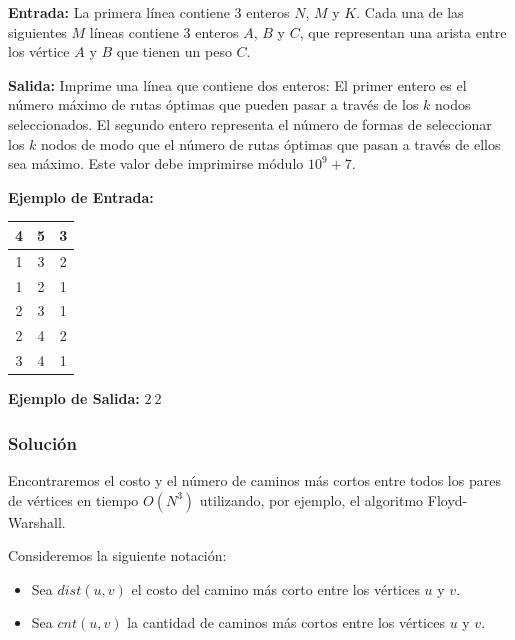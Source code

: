 \documentclass[12pt]{article}
\newcommand{\nl}{\vspace{0.3cm}}
\begin{document}
\nl

\textbf{Entrada:} La primera línea contiene $3$ enteros $N$, $M$ y $K$. Cada una de las siguientes $M$ líneas contiene $3$ enteros $A$, $B$ y $C$, que representan una arista entre los vértice $A$ y $B$ que tienen un peso $C$.

\nl

\textbf{Salida:} Imprime una línea que contiene dos enteros: El primer entero es el número máximo de rutas óptimas que pueden pasar a través de los $k$ nodos seleccionados. El segundo entero representa el número de formas de seleccionar los $k$ nodos de modo que el número de rutas óptimas que pasan a través de ellos sea máximo. Este valor debe imprimirse módulo $10^9 +7$.

\nl

\textbf{Ejemplo de Entrada:}

\nl

\begin{tabular}{|c|c|c|}
	\hline 4 & 5 & 3 \\ 
	\hline 1 & 3 & 2 \\ 
	\hline 1 & 2 & 1 \\ 
	\hline 2 & 3 & 1 \\ 
	\hline 2 & 4 & 2 \\ 
	\hline 3 & 4 & 1 \\ 
	\hline 
\end{tabular}

\nl

\textbf{Ejemplo de Salida:} $2\ 2$

\subsubsection{Solución}

\nl

Encontraremos el costo y el número de caminos más cortos entre todos los pares de vértices en tiempo $O(N^3)$ utilizando, por ejemplo, el algoritmo Floyd-Warshall.

\nl

Consideremos la siguiente notación:

\nl

\begin{itemize}
	\item Sea $dist(u, v)$ el costo del camino más corto entre los vértices $u$ y $v$.
	\item Sea $cnt(u, v)$ la cantidad de caminos más cortos entre los vértices $u$ y $v$.
\end{itemize}
\end{document}
